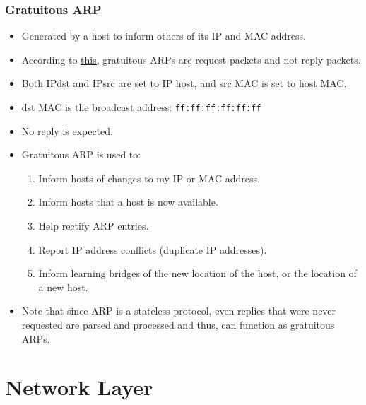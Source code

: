 \documentclass{report}
\begin{document}
\subsection{Gratuitous ARP}
\begin{itemize}
\item Generated by a host to inform others of its IP and MAC address.
\item According to \href{https://networkengineering.stackexchange.com/questions/7713/how-does-gratuitous-arp-work}{this,} gratuitous ARPs are request packets and not reply packets.
\item Both IPdst and IPsrc are set to IP host, and src MAC is set to host MAC.
\item dst MAC is the broadcast address: \texttt{ff:ff:ff:ff:ff:ff}
\item No reply is expected.
\item Gratuitous ARP is used to:
\begin{enumerate}
\item Inform hosts of changes to my IP or MAC address.
\item Inform hosts that a host is now available.
\item Help rectify ARP entries.
\item Report IP address conflicts (duplicate IP addresses).
\item Inform learning bridges of the new location of the host, or the location of a new host.
\end{enumerate}
\item Note that since ARP is a stateless protocol, even replies that were never requested are parsed and processed and thus, can function as gratuitous ARPs.
\end{itemize}


\chapter{Network Layer}
\end{document}
